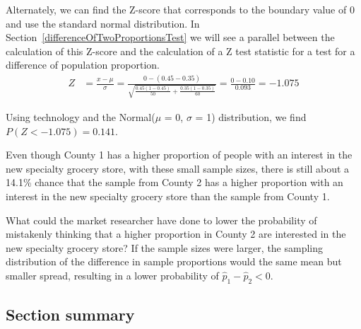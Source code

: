 \begin{examplewrap}
\begin{nexample}
Alternately,  we can find the Z-score that corresponds to the boundary value of 0 and use the standard normal distribution.  In Section~\ref{differenceOfTwoProportionsTest} we will see a parallel between the calculation of this Z-score and the calculation of a Z test statistic for a test for a difference of population proportion.
\begin{align*}
Z &= \frac{x - \mu}{\sigma} =\frac{0-(0.45-0.35)}{\sqrt{\frac{0.45(1-0.45)}{50} + \frac{0.35(1-0.35)}{60}}} =  \frac{0 - 0.10}{0.093}=-1.075
\end{align*}
\begin{center}
\hspace{5mm}
\end{center}
Using technology and the Normal($\mu$ = 0, $\sigma$ = 1) distribution, we find $P(Z < -1.075) = 0.141$.  

Even though County 1 has a higher proportion of people with an interest in the new specialty grocery store, with these small sample sizes, there is still about a 14.1\% chance that the sample from County 2 has a higher proportion with an interest in the new specialty grocery store than the sample from County 1.
\end{nexample}
\end{examplewrap}

\begin{examplewrap}
\begin{nexample}{What could the market researcher have done to lower the probability of mistakenly thinking that a higher proportion in County 2 are interested in the new specialty grocery store?}
If the sample sizes were larger, the sampling distribution of the difference in sample proportions would the same mean but smaller spread, resulting in a lower probability of $\hat{p}_1-\hat{p}_2<0$. 
\end{nexample}
\end{examplewrap}

\newpage
\subsection*{Section summary}

